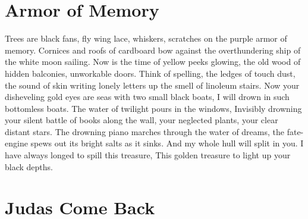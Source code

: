 \documentclass[english,11pt,letterpaper,onecolumn,parskip=full]{scrbook}
\begin{document}
\newpage
\section{Armor of Memory}

\begin{poem}
\begin{stanza}
Trees are black fans, fly wing lace, whiskers, scratches on the purple armor of memory. \verseline
Cornices and roofs of cardboard bow against the overthundering ship of the white moon sailing. \verseline
Now is the time of yellow peeks glowing, the old wood of hidden balconies, unworkable doors. \verseline
Think of spelling, the ledges of touch dust, the sound of skin writing lonely letters up the smell of linoleum stairs. \verseline
Now your disheveling gold eyes are seas with two small black boats, I will drown in such bottomless boats. \verseline
The water of twilight pours in the windows, \verseline
Invisibly drowning your silent battle of books along the wall, your neglected plants, your clear distant stars. \verseline
The drowning piano marches through the water of dreams, the fate-engine spews out its bright salts as it sinks. \verseline
And my whole hull will split in you.  I have always longed to spill this treasure, \verseline
This golden treasure to light up your black depths.
\end{stanza}
\end{poem}

\newpage
\section{Judas Come Back}
\end{document}
